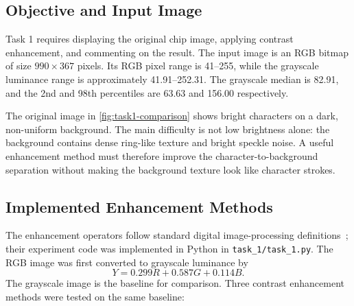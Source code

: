 \subsection{Objective and Input Image}

Task 1 requires displaying the original chip image, applying contrast
enhancement, and commenting on the result.  The input image is an RGB bitmap of
size $990\times367$ pixels.  Its RGB pixel range is 41--255, while the grayscale
luminance range is approximately 41.91--252.31.  The grayscale median is 82.91,
and the 2nd and 98th percentiles are 63.63 and 156.00 respectively.

The original image in \cref{fig:task1-comparison} shows bright characters on a
dark, non-uniform background.  The main difficulty is not low brightness alone:
the background contains dense ring-like texture and bright speckle noise.  A
useful enhancement method must therefore improve the character-to-background
separation without making the background texture look like character strokes.

\subsection{Implemented Enhancement Methods}

The enhancement operators follow standard digital image-processing
definitions~\cite{gonzalez2018}; their experiment code was implemented in Python
in \texttt{task\_1/task\_1.py}.  The
RGB image was first converted to grayscale luminance by
\begin{equation}
  Y = 0.299R + 0.587G + 0.114B .
  \label{eq:task1-grayscale}
\end{equation}
The grayscale image is the baseline for comparison.  Three contrast enhancement
methods were tested on the same baseline:

